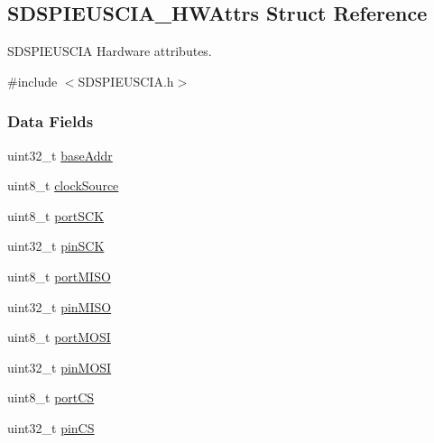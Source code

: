 \subsection{S\-D\-S\-P\-I\-E\-U\-S\-C\-I\-A\-\_\-\-H\-W\-Attrs Struct Reference}
\label{struct_s_d_s_p_i_e_u_s_c_i_a___h_w_attrs}


S\-D\-S\-P\-I\-E\-U\-S\-C\-I\-A Hardware attributes.  




{\ttfamily \#include $<$S\-D\-S\-P\-I\-E\-U\-S\-C\-I\-A.\-h$>$}

\subsubsection*{Data Fields}
\begin{DoxyCompactItemize}
\item 
uint32\-\_\-t \hyperlink{struct_s_d_s_p_i_e_u_s_c_i_a___h_w_attrs_ab236325aef69dbab2cb88596186593d9}{base\-Addr}
\item 
uint8\-\_\-t \hyperlink{struct_s_d_s_p_i_e_u_s_c_i_a___h_w_attrs_aba5596a4f2d57b8832fd3f7e8c5eca86}{clock\-Source}
\item 
uint8\-\_\-t \hyperlink{struct_s_d_s_p_i_e_u_s_c_i_a___h_w_attrs_a3584afb53fee3eb002578f7eabcdd923}{port\-S\-C\-K}
\item 
uint32\-\_\-t \hyperlink{struct_s_d_s_p_i_e_u_s_c_i_a___h_w_attrs_aeace0c995970ae38e9e16bb39d14084f}{pin\-S\-C\-K}
\item 
uint8\-\_\-t \hyperlink{struct_s_d_s_p_i_e_u_s_c_i_a___h_w_attrs_ac525b97dac5dec5b011b3c3b45e7df65}{port\-M\-I\-S\-O}
\item 
uint32\-\_\-t \hyperlink{struct_s_d_s_p_i_e_u_s_c_i_a___h_w_attrs_ad84c140e008423d5d69c8c71912c83a6}{pin\-M\-I\-S\-O}
\item 
uint8\-\_\-t \hyperlink{struct_s_d_s_p_i_e_u_s_c_i_a___h_w_attrs_ae5495a58ab3bc8f23646dfabd24c1394}{port\-M\-O\-S\-I}
\item 
uint32\-\_\-t \hyperlink{struct_s_d_s_p_i_e_u_s_c_i_a___h_w_attrs_abe5be1068e92c174db83a87b430c0c6c}{pin\-M\-O\-S\-I}
\item 
uint8\-\_\-t \hyperlink{struct_s_d_s_p_i_e_u_s_c_i_a___h_w_attrs_a669ad55ec90fcc5c37c13b86f23bad1c}{port\-C\-S}
\item 
uint32\-\_\-t \hyperlink{struct_s_d_s_p_i_e_u_s_c_i_a___h_w_attrs_acc7a51ef098ed1cc7ef4d930fcd2aada}{pin\-C\-S}
\end{DoxyCompactItemize}



